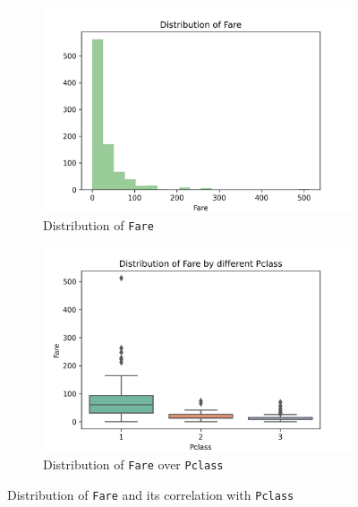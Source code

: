 \documentclass[10pt]{article}
\begin{document}
\begin{figure}[!htbp]
    \centering
    \begin{subfigure}[b]{0.49\textwidth}
        \centering
        \includegraphics[width=\textwidth]{../hw1/img/Part_II/distribution_of_fare.png}
        \caption{Distribution of \texttt{Fare}}
        \label{fig:fare_distribution}
    \end{subfigure}
    \hfill
    \begin{subfigure}[b]{0.49\textwidth}
        \centering
        \includegraphics[width=\textwidth]{../hw1/img/Part_II/distribution_of_fare_by_pclass.png}
        \caption{Distribution of \texttt{Fare} over \texttt{Pclass}}
        \label{fig:fare_vs_pclass}
    \end{subfigure}
    \caption{Distribution of \texttt{Fare} and its correlation with \texttt{Pclass}}
    \label{fig:fare}
\end{figure}
\end{document}
